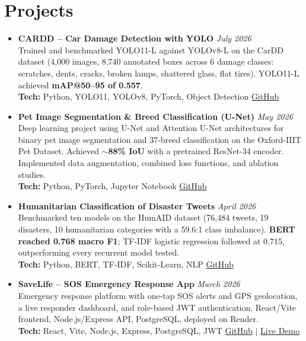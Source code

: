 \documentclass[a4paper,11pt]{article}
\newcommand{\cvmeta}[1]{\textcolor{cvmuted}{\textit{#1}}}
\begin{document}
\section*{Projects}
\begin{itemize}[leftmargin=*, itemsep=7pt, parsep=0pt, topsep=3pt]

    \item \textbf{CARDD -- Car Damage Detection with YOLO} \hfill \cvmeta{July 2026}\\
    Trained and benchmarked YOLO11-L against YOLOv8-L on the CarDD dataset (4,000 images, 8,740 annotated boxes across 6 damage classes: scratches, dents, cracks, broken lamps, shattered glass, flat tires). YOLO11-L achieved \textbf{mAP@50--95 of 0.557}.\\
    \textbf{Tech:} Python, YOLO11, YOLOv8, PyTorch, Object Detection \quad \href{https://github.com/Aditi-Adri/CARDD---Car-Damage-Detection-with-YOLO}{GitHub}

    \item \textbf{Pet Image Segmentation \& Breed Classification (U-Net)} \hfill \cvmeta{May 2026}\\
    Deep learning project using U-Net and Attention U-Net architectures for binary pet image segmentation and 37-breed classification on the Oxford-IIIT Pet Dataset. Achieved \textbf{$\sim$88\% IoU} with a pretrained ResNet-34 encoder. Implemented data augmentation, combined loss functions, and ablation studies.\\
    \textbf{Tech:} Python, PyTorch, Jupyter Notebook \quad \href{https://github.com/Aditi-Adri/Image-Processing-Project---pet-segmentation-classification-unet-CSE428}{GitHub}

    \item \textbf{Humanitarian Classification of Disaster Tweets} \hfill \cvmeta{April 2026}\\
    Benchmarked ten models on the HumAID dataset (76,484 tweets, 19 disasters, 10 humanitarian categories with a 59.6:1 class imbalance). \textbf{BERT reached 0.768 macro F1}; TF-IDF logistic regression followed at 0.715, outperforming every recurrent model tested.\\
    \textbf{Tech:} Python, BERT, TF-IDF, Scikit-Learn, NLP \quad \href{https://github.com/Aditi-Adri/Humanitarian-Category-Classification-of-Disaster-Tweets}{GitHub}

    \item \textbf{SaveLife -- SOS Emergency Response App} \hfill \cvmeta{March 2026}\\
    Emergency response platform with one-tap SOS alerts and GPS geolocation, a live responder dashboard, and role-based JWT authentication. React/Vite frontend, Node.js/Express API, PostgreSQL, deployed on Render.\\
    \textbf{Tech:} React, Vite, Node.js, Express, PostgreSQL, JWT \quad \href{https://github.com/Aditi-Adri/SaveLife}{GitHub} $|$ \href{https://savelife-tuwk.onrender.com/}{Live Demo}


\end{itemize}
\end{document}

